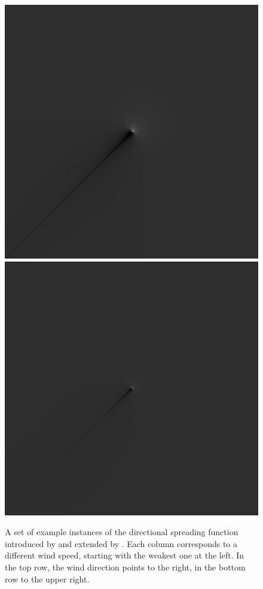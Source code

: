 \begin{figure}
{ }
 \hfill
 \subtop
 {
 \includegraphics[scale=0.25]{figures/mitsuyasu_dfilt_wur_sqrt50.png}
 }
 \hfill
 \subtop
 {
 \includegraphics[scale=0.25]{figures/mitsuyasu_dfilt_wur_sqrt200.png}
 }
\caption[The directional spreading function as introduced by
\citet{article:Mitsuyasu1975} and extended by \citet{article:Hasselmann1980}]{
A set of example instances of the directional spreading function
introduced by \citet{article:Mitsuyasu1975} and extended by
\citet{article:Hasselmann1980}.
Each column corresponds to a different wind speed, starting with the weakest
one at the left. In the top row, the wind direction points to the right, in the
bottom row to the upper right.}
\label{fig:directional_filter}
\end{figure}

